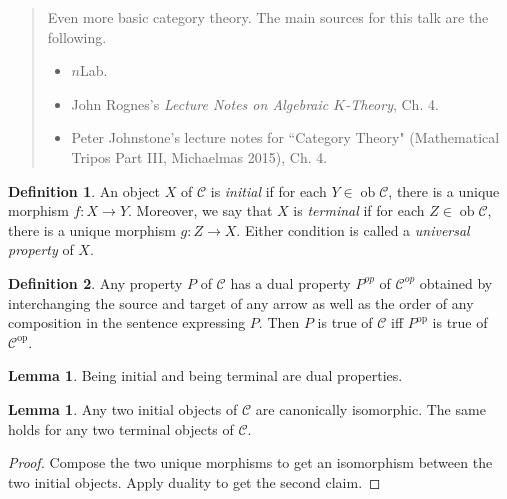\documentclass[10pt,letterpaper,cm]{nupset}
\theoremstyle{definition}
\newtheorem{definition}{Definition}
\theoremstyle{theorem}
\newtheorem{lemma}[theorem]{Lemma}
\theoremstyle{remark}
\newcommand{\1}{\mathbf{1}}
\renewcommand{\c}{\mathscr{C}}
\newcommand{\0}{\vec 0}
\DeclareMathOperator{\op}{op}
\DeclareMathOperator{\ob}{ob}
\begin{document}
\begin{abstract}
Even more basic category theory. The main sources for this talk are the following.
\begin{itemize}
\item $n$Lab.
\item John Rognes's \textit{Lecture Notes on Algebraic $K$-Theory}, Ch. 4.
\item Peter Johnstone's lecture notes for ``Category Theory" (Mathematical Tripos Part III, Michaelmas 2015), Ch. 4.
\end{itemize}
\end{abstract}

\begin{definition}
An object $X$ of $\c$ is \textit{initial} if for each $Y \in \ob \c$, there is a unique morphism $f : X \to Y$. Moreover, we say that $X$ is \textit{terminal} if for each $Z \in \ob \c$, there is a unique morphism $g : Z \to X$. Either condition is called a \textit{universal property} of $X$.
\end{definition}

\begin{definition}
Any property $P$ of $\c$ has a dual property $P^{op}$ of $\c^{op}$ obtained by interchanging the source and target of any arrow as well as the order of any composition in the sentence expressing $P$. Then $P$ is true of $\c$ iff $P^{\op}$ is true of $\c^{\op}$.
\end{definition}

\begin{lemma}
Being initial and being terminal are dual properties.
\end{lemma}

\begin{lemma}\label{initial}
Any two initial objects of $\c$ are canonically isomorphic. The same holds for any two terminal objects of $\c$.
\end{lemma}
\begin{proof}
Compose the two unique morphisms to get an isomorphism between the two initial objects. Apply duality to get the second claim.
\end{proof}
\end{document}
